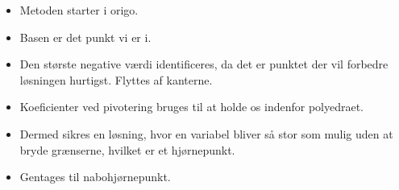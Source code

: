 \begin{frame}
\begin{itemize}


\item Metoden starter i origo.
\item Basen er det punkt vi er i.
\item Den største negative værdi identificeres, da det er punktet der vil forbedre løsningen hurtigst. Flyttes af kanterne. 
\item Koeficienter ved pivotering bruges til at holde os indenfor polyedraet.
\item  Dermed sikres en løsning, hvor en variabel bliver så stor som mulig uden at bryde grænserne, hvilket er et hjørnepunkt.
\item Gentages til nabohjørnepunkt.
\end{itemize}
\end{frame}


